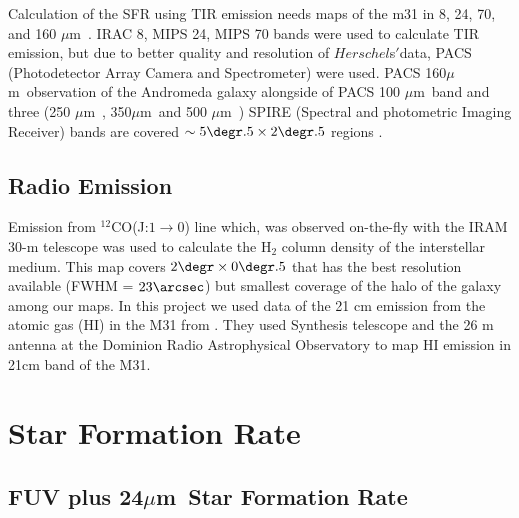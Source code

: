 \documentclass[useAMS,usenatbib]{mn2e}
\newcommand \um    {$\mu$m\ }
\begin{document}
Calculation of the SFR using TIR emission needs maps of the m31 in 8, 24, 70, and 160 \um. IRAC 8, MIPS 24, MIPS 70 bands were used to calculate TIR emission, but due to better quality and resolution of $Herschel$s$'$data, PACS (Photodetector Array Camera and Spectrometer) \citep{Poglitsch10} were used. PACS 160\um observation of the Andromeda galaxy alongside of PACS 100 \um band and three (250 \um, 350\um and 500 \um) SPIRE (Spectral and photometric Imaging Receiver) \citep{Griffin10} bands are covered $\sim 5\degr.5 \times 2\degr.5$ regions \citep{Fritz12}.

\subsection{Radio Emission}
Emission from $^{12}$CO(J:$1\rightarrow0$) line which, was observed on-the-fly with the IRAM 30-m telescope\citep{Nieten06} was used to calculate the H$_2$ column density of the interstellar medium. This map covers $2\degr \times 0\degr.5$ that has the best resolution available (FWHM = $23\arcsec$) but smallest coverage of the halo of the galaxy among our maps. In this project we used data of the 21 cm emission from the atomic gas (HI) in the M31 from \cite{Chemin09}. They used Synthesis telescope and the 26 m antenna at the Dominion Radio Astrophysical Observatory to map HI emission in 21cm band of the M31.





\section{Star Formation Rate}
\subsection{FUV plus 24\um Star Formation Rate}
\end{document}
